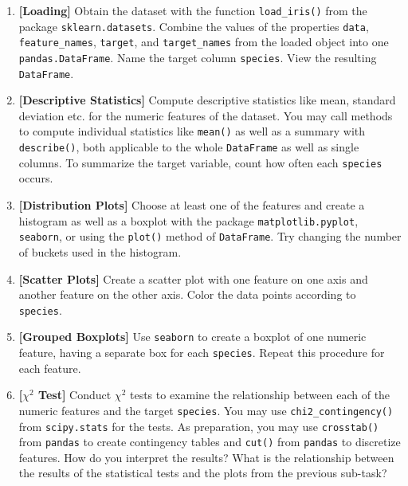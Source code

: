 \documentclass[12pt]{article}
\newcommand{\code}[1]{\textcolor{kitgreen}{\texttt{#1}}}
\newcommand{\taskname}[1]{\textcolor{kitblue}{\textbf{[#1]}}}
\begin{document}
\begin{enumerate}[label=\alph*), left=0pt, itemsep=12pt]
	\item
	\taskname{Loading}
	Obtain the dataset with the function \code{load\_iris()} from the package \code{sklearn.datasets}.
	Combine the values of the properties \code{data}, \code{feature\_names}, \code{target}, and \code{target\_names} from the loaded object into one \code{pandas.DataFrame}.
	Name the target column \code{species}.
	View the resulting \code{DataFrame}.
	\item
	\taskname{Descriptive Statistics}
	Compute descriptive statistics like mean, standard deviation etc. for the numeric features of the dataset.
	You may call methods to compute individual statistics like \code{mean()} as well as a summary with \code{describe()}, both applicable to the whole \code{DataFrame} as well as single columns.
	\newline
	To summarize the target variable, count how often each \code{species} occurs.
	\item
	\taskname{Distribution Plots}
	Choose at least one of the features and create a histogram as well as a boxplot with the package \code{matplotlib.pyplot}, \code{seaborn}, or using the \code{plot()} method of \code{DataFrame}.
	Try changing the number of buckets used in the histogram.
	\item
	\taskname{Scatter Plots}
	Create a scatter plot with one feature on one axis and another feature on the other axis.
	Color the data points according to \code{species}.
	\item
	\taskname{Grouped Boxplots}
	Use \code{seaborn} to create a boxplot of one numeric feature, having a separate box for each \code{species}.
	Repeat this procedure for each feature.
	\item
	\taskname{$\chi^2$ Test}
	Conduct $\chi^2$ tests to examine the relationship between each of the numeric features and the target \code{species}.
	You may use \code{chi2\_contingency()} from \code{scipy.stats} for the tests.
	As preparation, you may use \code{crosstab()} from \code{pandas} to create contingency tables and \code{cut()} from \code{pandas} to discretize features.
	\newline
	How do you interpret the results?
	What is the relationship between the results of the statistical tests and the plots from the previous sub-task?
\end{enumerate}
\end{document}
